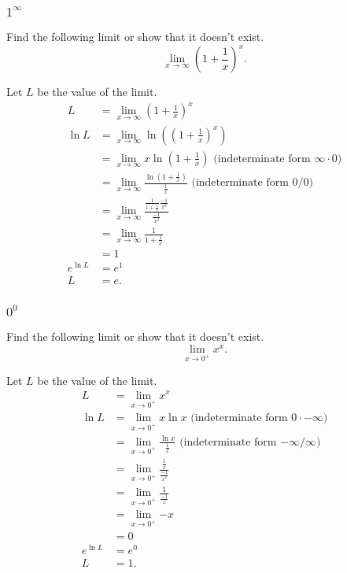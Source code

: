 \subsubsection{$1^\infty$}
\begin{example}
	Find the following limit or show that it doesn't exist.
	\begin{equation*}
		\lim_{x\to \infty}{\left(1+\frac{1}{x}\right)^x}.
	\end{equation*}
\end{example}
Let $L$ be the value of the limit.
\begin{align*}
	L &= \lim_{x\to \infty}{\left(1+\frac{1}{x}\right)^x} \\
	\ln{L} &= \lim_{x\to\infty}{\ln{\left(\left(1+\frac{1}{x}\right)^x\right)}} \\
	&= \lim_{x\to\infty}{x\ln{\left(1+\frac{1}{x}\right)}} \text{ (indeterminate form $\infty\cdot 0$)} \\
	&= \lim_{x\to\infty}{\frac{\ln{\left(1+\frac{1}{x}\right)}}{\frac{1}{x}}} \text{ (indeterminate form $0/0$)} \\
	&= \lim_{x\to\infty}{\frac{\frac{1}{1+\frac{1}{x}}\frac{-1}{x^2}}{\frac{-1}{x^2}}} \\
	&= \lim_{x\to\infty}{\frac{1}{1+\frac{1}{x}}} \\
	&= 1 \\
	e^{\ln{L}} &= e^1 \\
	L &= e.
\end{align*}

\subsubsection{$0^0$}
\begin{example}
	Find the following limit or show that it doesn't exist.
	\begin{equation*}
		\lim_{x\to 0^+}{x^x}.
	\end{equation*}
\end{example}
Let $L$ be the value of the limit.
\begin{align*}
	L &= \lim_{x\to 0^+}{x^x} \\
	\ln{L} &= \lim_{x\to 0^+}{x\ln{x}} \text{ (indeterminate form $0\cdot-\infty$)} \\
	&= \lim_{x\to 0^+}{\frac{\ln{x}}{\frac{1}{x}}} \text{ (indeterminate form $-\infty/\infty$)} \\
	&= \lim_{x\to 0^+}{\frac{\frac{1}{x}}{\frac{-1}{x^2}}} \\
	&= \lim_{x\to 0^+}{\frac{1}{\frac{-1}{x}}} \\
	&= \lim_{x\to 0^+}{-x} \\
	&= 0 \\
	e^{\ln{L}} &= e^0 \\
	L &= 1.
\end{align*}

